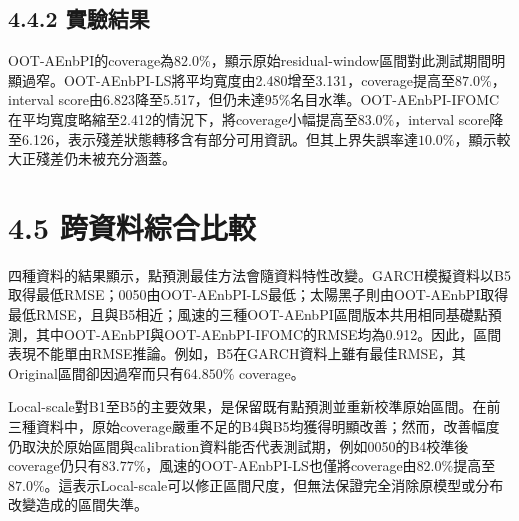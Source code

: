 \subsection*{4.4.2 實驗結果}

\begin{table}[H]
\centering
\caption{風速資料之OOT-AEnbPI三種區間預測器比較}
\label{tab:wind}
\end{table}

OOT-AEnbPI的coverage為$82.0\%$，顯示原始residual-window區間對此測試期間明顯過窄。OOT-AEnbPI-LS將平均寬度由2.480增至3.131，coverage提高至$87.0\%$，interval score由6.823降至5.517，但仍未達95\%名目水準。OOT-AEnbPI-IFOMC在平均寬度略縮至2.412的情況下，將coverage小幅提高至$83.0\%$，interval score降至6.126，表示殘差狀態轉移含有部分可用資訊。但其上界失誤率達$10.0\%$，顯示較大正殘差仍未被充分涵蓋。

\section*{4.5 跨資料綜合比較}

四種資料的結果顯示，點預測最佳方法會隨資料特性改變。GARCH模擬資料以B5取得最低RMSE；0050由OOT-AEnbPI-LS最低；太陽黑子則由OOT-AEnbPI取得最低RMSE，且與B5相近；風速的三種OOT-AEnbPI區間版本共用相同基礎點預測，其中OOT-AEnbPI與OOT-AEnbPI-IFOMC的RMSE均為0.912。因此，區間表現不能單由RMSE推論。例如，B5在GARCH資料上雖有最佳RMSE，其Original區間卻因過窄而只有$64.850\%$ coverage。

Local-scale對B1至B5的主要效果，是保留既有點預測並重新校準原始區間。在前三種資料中，原始coverage嚴重不足的B4與B5均獲得明顯改善；然而，改善幅度仍取決於原始區間與calibration資料能否代表測試期，例如0050的B4校準後coverage仍只有$83.77\%$，風速的OOT-AEnbPI-LS也僅將coverage由$82.0\%$提高至$87.0\%$。這表示Local-scale可以修正區間尺度，但無法保證完全消除原模型或分布改變造成的區間失準。

